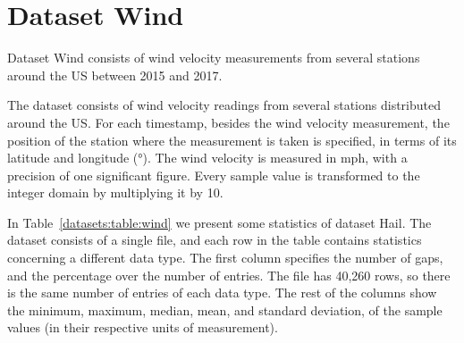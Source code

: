 
\vspace{-10pt}
\section{Dataset Wind}
\label{datasets:wind}

Dataset Wind \cite{dataset:spc} consists of wind velocity measurements from several stations around the US between 2015 and 2017. \SPCDef


The dataset consists of wind velocity readings from several stations distributed around the US. For each timestamp, besides the wind velocity measurement, the position of the station where the measurement is taken is specified, in terms of its latitude and longitude (°). The wind velocity is measured in mph, with a precision of one significant figure. Every sample value is transformed to the integer domain by multiplying it by 10.


In Table~\ref{datasets:table:wind} we present some statistics of dataset Hail. The dataset consists of a single file, and each row in the table contains statistics concerning a different data type. The first column specifies the number of gaps, and the percentage over the number of entries. The file has 40,260 rows, so there is the same number of entries of each data type. The rest of the columns show the minimum, maximum, median, mean, and standard deviation, of the sample values (in their respective units of measurement).



